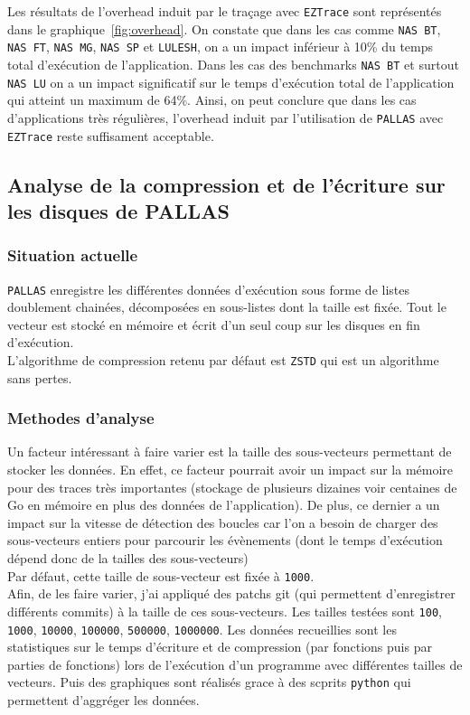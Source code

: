 Les résultats de l'overhead induit par le traçage avec \verb!EZTrace! sont représentés dans le graphique~\ref{fig:overhead}.
On constate que dans les cas comme \verb!NAS BT!, \verb!NAS FT!, \verb!NAS MG!, \verb!NAS SP! et \verb!LULESH!, on a un impact inférieur à 10\% du temps total d'exécution de l'application.
Dans les cas des benchmarks \verb!NAS BT! et surtout \verb!NAS LU! on a un impact significatif sur le temps d'exécution total de l'application qui atteint un maximum de 64\%.
Ainsi, on peut conclure que dans les cas d'applications très régulières, l'overhead induit par l'utilisation de \verb!PALLAS! avec \verb!EZTrace! reste suffisament acceptable.

\subsection{Analyse de la compression et de l'écriture sur les disques de PALLAS}\label{ssce:wrt_write}

\subsubsection{Situation actuelle}\label{ssec:wrt_situ}

\verb!PALLAS! enregistre les différentes données d'exécution sous forme de listes doublement chainées, décomposées en sous-listes dont la taille est fixée.
Tout le vecteur est stocké en mémoire et écrit d'un seul coup sur les disques en fin d'exécution.\\
L'algorithme de compression retenu par défaut est \verb!ZSTD! qui est un algorithme sans pertes.

\subsubsection{Methodes d'analyse}\label{ssec:wrt_analysis}

Un facteur intéressant à faire varier est la taille des sous-vecteurs permettant de stocker les données.
En effet, ce facteur pourrait avoir un impact sur la mémoire pour des traces très importantes (stockage de plusieurs dizaines voir centaines de Go en mémoire en plus des données de l'application).
De plus, ce dernier a un impact sur la vitesse de détection des boucles car l'on a besoin de charger des sous-vecteurs entiers pour parcourir les évènements (dont le temps d'exécution dépend donc de la tailles des 
sous-vecteurs)\\
Par défaut, cette taille de sous-vecteur est fixée à \verb!1000!.\\
Afin, de les faire varier, j'ai appliqué des patchs git (qui permettent d'enregistrer différents commits) à la taille de ces sous-vecteurs.
Les tailles testées sont \verb!100!, \verb!1000!, \verb!10000!, \verb!100000!, \verb!500000!, \verb!1000000!.
Les données recueillies sont les statistiques sur le temps d'écriture et de compression (par fonctions puis par parties de fonctions) lors de l'exécution
d'un programme avec différentes tailles de vecteurs.
Puis des graphiques sont réalisés grace à des scprits \verb!python! qui permettent d'aggréger les données. 

